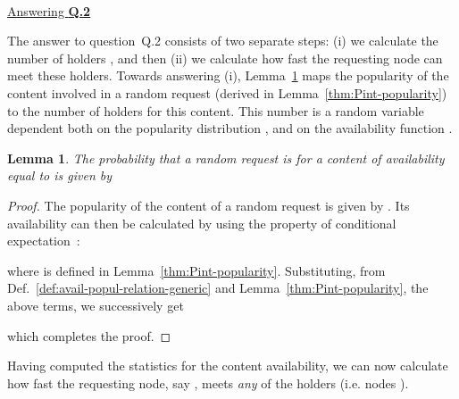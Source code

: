 \documentclass[journal]{IEEEtran}
\newtheorem{lemma}{Lemma}
\newtheorem{corollary}{Corollary}
\begin{document}



~\\
\noindent\underline{Answering \textbf{Q.2}}

The answer to question~Q.2 consists of two separate steps: (i) we calculate the number of holders , and then (ii) we calculate how fast the requesting node can meet these holders. Towards answering (i), Lemma~\ref{thm:Pint-availability-generic} maps the popularity of the content involved in a random request (derived in Lemma~\ref{thm:Pint-popularity}) to the number of holders for this content. This number is a random variable dependent both on the popularity distribution , and on the availability function .
\begin{lemma}\label{thm:Pint-availability-generic}
The probability that a random request is for a content of availability equal to  is given by

\end{lemma}
\begin{proof}
The popularity of the content of a random request is given by . Its availability can then be calculated by using the property of conditional expectation~\cite{RossProbModels}:

where  is defined in Lemma~\ref{thm:Pint-popularity}. Substituting, from Def.~\ref{def:avail-popul-relation-generic} and Lemma~\ref{thm:Pint-popularity}, the above terms, we successively get

which completes the proof.
\end{proof}

Having computed the statistics for the content availability, we can now calculate how fast the requesting node, say , meets \textit{any} of the holders  (i.e. nodes ). 
\end{document}
